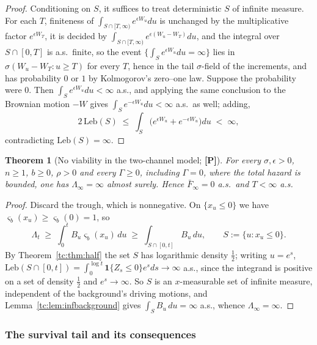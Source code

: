 \documentclass[11pt]{article}
\numberwithin{equation}{section}
\theoremstyle{plain}
\newtheorem{theorem}{Theorem}[section]
\theoremstyle{definition}
\theoremstyle{remark}
\newcommand{\one}{\mathbf{1}}
\begin{document}
\begin{proof}
Conditioning on $S$, it suffices to treat deterministic $S$ of
infinite measure. For each $T$, finiteness of
$\int_{S\cap[T,\infty)}e^{\epsilon W_u}du$ is unchanged by the
multiplicative factor $e^{\epsilon W_T}$, it is decided by
$\int_{S\cap[T,\infty)}e^{\epsilon(W_u-W_T)}du$, and the integral
over $S\cap[0,T]$ is a.s.\ finite, so the event
$\{\int_S e^{\epsilon W_u}du=\infty\}$ lies in
$\sigma(W_u-W_T:u\ge T)$ for every $T$, hence in the tail
$\sigma$-field of the increments, and has probability $0$ or $1$ by
Kolmogorov's zero--one law. Suppose the probability were $0$. Then
$\int_S e^{\epsilon W_u}du<\infty$ a.s., and applying the same
conclusion to the Brownian motion $-W$ gives
$\int_S e^{-\epsilon W_u}du<\infty$ a.s.\ as well; adding,
\[
2\,\mathrm{Leb}(S)\;\le\;\int_S\bigl(e^{\epsilon W_u}
+e^{-\epsilon W_u}\bigr)du\;<\;\infty,
\]
contradicting $\mathrm{Leb}(S)=\infty$.
\end{proof}

\begin{theorem}[No viability in the two-channel model; \textbf{[P]}]
\label{tc:thm:noviab2}
For every $\sigma,\epsilon>0$, $n\ge1$, $b\ge0$, $\rho>0$ and every
$\Gamma\ge0$, including $\Gamma=0$, where the total hazard is
bounded, one has $\Lambda_{\infty}=\infty$ almost surely. Hence
$\bar F_{\infty}=0$ a.s.\ and $T<\infty$ a.s.
\end{theorem}

\begin{proof}
Discard the trough, which is nonnegative. On $\{x_u\le0\}$ we have
$\varsigma_b(x_u)\ge\varsigma_b(0)=1$, so
\[
\Lambda_{t}\;\ge\;\int_{0}^{t}B_u\varsigma_b(x_u)\,du
\;\ge\;\int_{S\cap[0,t]}B_u\,du,
\qquad S:=\{u:x_u\le0\}.
\]
By Theorem~\ref{tc:thm:half} the set $S$ has logarithmic density
$\tfrac12$; writing $u=e^{s}$,
$\mathrm{Leb}(S\cap[0,t])=\int_{0}^{\log t}\one\{Z_s\le0\}e^{s}ds
\to\infty$ a.s., since the integrand is positive on a set of density
$\tfrac12$ and $e^{s}\to\infty$. So $S$ is an $x$-measurable set of
infinite measure, independent of the background's driving motions, and
Lemma~\ref{tc:lem:infbackground} gives
$\int_S B_u\,du=\infty$ a.s., whence $\Lambda_{\infty}=\infty$.
\end{proof}

\subsubsection{The survival tail and its consequences}\label{sh:subsub:tail}
\end{document}
